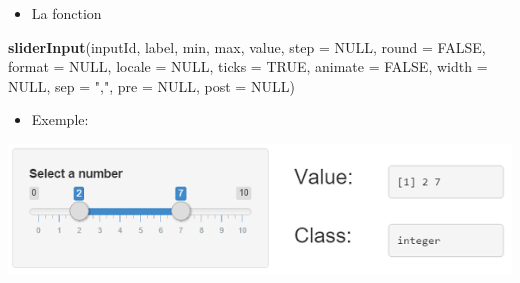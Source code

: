 \documentclass[]{article}
\newenvironment{Shaded}{\begin{snugshade}}{\end{snugshade}}
\newcommand{\KeywordTok}[1]{\textcolor[rgb]{0.13,0.29,0.53}{\textbf{#1}}}
\newcommand{\DataTypeTok}[1]{\textcolor[rgb]{0.13,0.29,0.53}{#1}}
\newcommand{\DecValTok}[1]{\textcolor[rgb]{0.00,0.00,0.81}{#1}}
\newcommand{\StringTok}[1]{\textcolor[rgb]{0.31,0.60,0.02}{#1}}
\newcommand{\CommentTok}[1]{\textcolor[rgb]{0.56,0.35,0.01}{\textit{#1}}}
\newcommand{\OtherTok}[1]{\textcolor[rgb]{0.56,0.35,0.01}{#1}}
\newcommand{\NormalTok}[1]{#1}
\providecommand{\tightlist}{%
  \setlength{\itemsep}{0pt}\setlength{\parskip}{0pt}}
\begin{document}
\begin{itemize}
\tightlist
\item
  La fonction
\end{itemize}

\begin{Shaded}
\begin{Highlighting}[]
\KeywordTok{sliderInput}\NormalTok{(inputId, label, min, max, value, }\DataTypeTok{step =} \OtherTok{NULL}\NormalTok{, }\DataTypeTok{round =} \OtherTok{FALSE}\NormalTok{,}
            \DataTypeTok{format =} \OtherTok{NULL}\NormalTok{, }\DataTypeTok{locale =} \OtherTok{NULL}\NormalTok{, }\DataTypeTok{ticks =} \OtherTok{TRUE}\NormalTok{, }\DataTypeTok{animate =} \OtherTok{FALSE}\NormalTok{,}
            \DataTypeTok{width =} \OtherTok{NULL}\NormalTok{, }\DataTypeTok{sep =} \StringTok{","}\NormalTok{, }\DataTypeTok{pre =} \OtherTok{NULL}\NormalTok{, }\DataTypeTok{post =} \OtherTok{NULL}\NormalTok{)}
\end{Highlighting}
\end{Shaded}

\begin{itemize}
\tightlist
\item
  Exemple:
\end{itemize}

\begin{Shaded}
\end{Shaded}

\includegraphics{img/multiple_slider.png}
\end{document}
